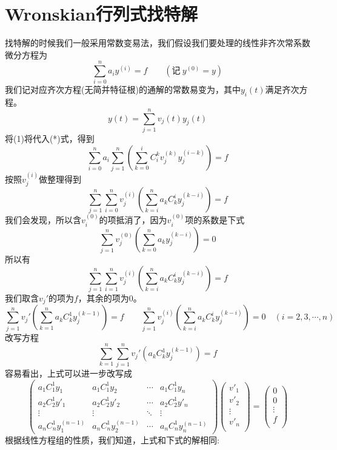 \section{Wronskian行列式找特解}
找特解的时候我们一般采用常数变易法，我们假设我们要处理的线性非齐次常系数微分方程为
\[\sum_{i=0}^na_iy^{(i)}=f \qquad (\text{记} \ y^{(0)}=y) \tag{*}\]
我们记对应齐次方程(无简并特征根)的通解的常数易变为，其中$y_i(t)$满足齐次方程。
\[y(t)=\sum_{j=1}^nv_j(t)y_j(t) \tag{1}\]
将(1)将代入(*)式，得到
\[\sum_{i=0}^na_i\sum_{j=1}^n\left(\sum_{k=0}^iC_i^kv_j^{(k)}y_j^{(i-k)}\right)=f\]
按照$v_j^{(i)}$做整理得到
\[\sum_{j=1}^n\sum_{i=0}^nv_j^{(i)}\left(\sum_{k=i}^{n}a_{k}C_{k}^iy_j^{(k-i)}\right)=f\]
我们会发现，所以含$v_i^{(0)}$的项抵消了，因为$v_i^{(0)}$项的系数是下式
\[\sum_{j=1}^nv_j^{(0)}\left(\sum_{k=0}^{n}a_{k}y_j^{(k-i)}\right)=0\]
所以有
\[\sum_{j=1}^n\sum_{i=1}^nv_j^{(i)}\left(\sum_{k=i}^{n}a_{k}C_{k}^iy_j^{(k-i)}\right)=f\]
我们取含$v_j'$的项为$f$，其余的项为0。
\[\sum_{j=1}^nv_j'\left(\sum_{k=1}^{n}a_{k}C_{k}^1y_j^{(k-1)}\right)=f \qquad \sum_{j=1}^nv_j^{(i)}\left(\sum_{k=i}^{n}a_{k}C_{k}^iy_j^{(k-i)}\right)=0 \quad (i=2,3,\cdots,n)\]
改写方程
\[\sum_{k=1}^{n}\sum_{j=1}^nv_j'\left(a_{k}C_{k}^1y_j^{(k-1)}\right)=f\]
容易看出，上式可以进一步改写成
\[
\begin{pmatrix}
    a_{1}C_{1}^1y_1 & a_{1}C_{1}^1y_2 & \cdots & a_{1}C_{1}^1y_n \\
    a_{2}C_{2}^1y'_1 & a_{2}C_{2}^1y'_2 & \cdots & a_{2}C_{2}^1y'_n \\
    \vdots & \vdots & \ddots & \vdots \\
    a_{n}C_{n}^1y^{(n-1)}_1 & a_{n}C_{n}^1y^{(n-1)}_2 & \cdots & a_{n}C_{n}^1y^{(n-1)}_n
\end{pmatrix}    
\begin{pmatrix}
    v'_1 \\ v'_2 \\ \vdots \\ v'_n \\
\end{pmatrix}   
=
\begin{pmatrix}
    0 \\ 0 \\ \vdots \\ f \\
\end{pmatrix}     
\]
根据线性方程组的性质，我们知道，上式和下式的解相同:
